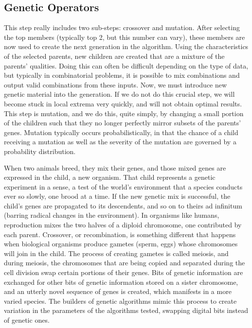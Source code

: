 \subsection{Genetic Operators}
This step really includes two sub-steps: crossover and mutation. After selecting the top members (typically top 2, but this number can vary), these members are now used to create the next generation in the algorithm. Using the characteristics of the selected parents, new children are created that are a mixture of the parents’ qualities. Doing this can often be difficult depending on the type of data, but typically in combinatorial problems, it is possible to mix combinations and output valid combinations from these inputs. Now, we must introduce new genetic material into the generation. If we do not do this crucial step, we will become stuck in local extrema very quickly, and will not obtain optimal results. This step is mutation, and we do this, quite simply, by changing a small portion of the children such that they no longer perfectly mirror subsets of the parents’ genes. Mutation typically occurs probabilistically, in that the chance of a child receiving a mutation as well as the severity of the mutation are governed by a probability distribution.

When two animals breed, they mix their genes, and those mixed genes are expressed in the child, a new organism. That child represents a genetic experiment in a sense, a test of the world’s environment that a species conducts ever so slowly, one brood at a time. If the new genetic mix is successful, the child’s genes are propagated to its descendents, and so on to theirs ad infinitum (barring radical changes in the environment). In organisms like humans, reproduction mixes the two halves of a diploid chromosome, one contributed by each parent. Crossover, or recombination, is something different that happens when biological organisms produce gametes (sperm, eggs) whose chromosomes will join in the child. The process of creating gametes is called meiosis, and during meiosis, the chromosomes that are being copied and separated during the cell division swap certain portions of their genes. Bits of genetic information are exchanged for other bits of genetic information stored on a sister chromosome, and an utterly novel sequence of genes is created, which manifests in a more varied species. The builders of genetic algorithms mimic this process to create variation in the parameters of the algorithms tested, swapping digital bits instead of genetic ones.

